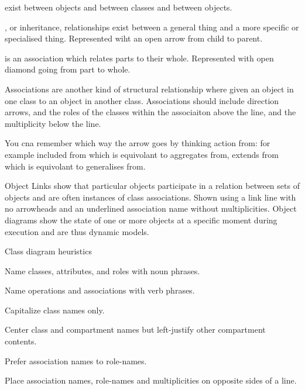 \begin{compactitem}
\begin{compactitem}
\item {} exist between objects and between classes and between objects. 
\begin{compactitem}
\item {}, or inheritance, relationships exist between a general thing and a more specific or specialised thing. Represented wiht an open arrow from child to parent. 
\item {} is an association which relates parts to their whole. Represented with open diamond going from part to whole. 
\end{compactitem}
Associations are another kind of structural relationship where given an object in one class to an object in another class.
Associations should include direction arrows, and the roles of the classes within the associaiton above the line, and the multiplicity below the line.
\item \begin{R} You cna remember which way the arrow goes by thinking action from: for example included from which is equivolant to aggregates from, extends from which is equivolant to generalises from. \end{R}
\item Object Links show that particular objects participate in a relation between sets of objects and are often instances of class associations. Shown using a link line with no arrowheads and an underlined association name without multiplicities. Object diagrams show the state of one or more objects at a specific moment during execution and are thus dynamic models.


\end{compactitem}

\item Class diagram heuristics
\begin{compactitem}
\item Name classes, attributes, and roles with noun phrases.
\item Name operations and associations with verb phrases.
\item Capitalize class names only.
\item Center class and compartment names but left-justify other compartment contents.
\item Prefer association names to role-names.
\item Place association names, role-names and multiplicities on opposite sides of a line.
\end{compactitem}


\end{compactitem}
